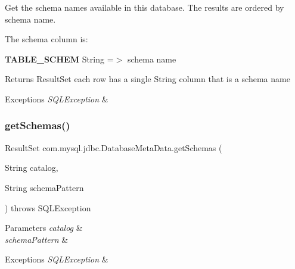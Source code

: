 Get the schema names available in this database. The results are ordered by schema name. 

The schema column is\+: 
\begin{DoxyEnumerate}
\item {\bfseries T\+A\+B\+L\+E\+\_\+\+S\+C\+H\+EM} String =$>$ schema name 
\end{DoxyEnumerate}

\begin{DoxyReturn}{Returns}
Result\+Set each row has a single String column that is a schema name 
\end{DoxyReturn}

\begin{DoxyExceptions}{Exceptions}
{\em S\+Q\+L\+Exception} & \\
\hline
\end{DoxyExceptions}
\mbox{\label{classcom_1_1mysql_1_1jdbc_1_1_database_meta_data_a63676aa9cfd3aed41c908397d59445d6}} 
\subsubsection{\texorpdfstring{get\+Schemas()}{getSchemas()}\hspace{0.1cm}{\footnotesize\ttfamily [2/2]}}
{\footnotesize\ttfamily Result\+Set com.\+mysql.\+jdbc.\+Database\+Meta\+Data.\+get\+Schemas (\begin{DoxyParamCaption}\item[{String}]{catalog,  }\item[{String}]{schema\+Pattern }\end{DoxyParamCaption}) throws S\+Q\+L\+Exception}


\begin{DoxyParams}{Parameters}
{\em catalog} & \\
\hline
{\em schema\+Pattern} & \\
\hline
\end{DoxyParams}

\begin{DoxyExceptions}{Exceptions}
{\em S\+Q\+L\+Exception} & \\
\hline
\end{DoxyExceptions}
\mbox{\label{classcom_1_1mysql_1_1jdbc_1_1_database_meta_data_a3eaeb847fdebe1c01ccb377c99bb3142}} 

